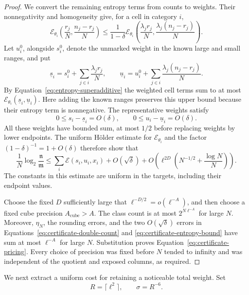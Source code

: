 \begin{proof}
We convert the remaining entropy terms from counts to weights. Their
nonnegativity and homogeneity give, for a cell in category \(i\),
\[
 \mathcal E_{\theta_i}\!\left(\frac{r_j}{N},\frac{n_j-r_j}{N}\right)
 \le\frac1{1-\delta}
 \mathcal E_{\theta_i}\!\left(
       \frac{\lambda_jr_j}{N},\frac{\lambda_j(n_j-r_j)}{N}\right).
\]
Let \(u_i^0\), alongside \(s_i^0\), denote the unmarked weight in the
known large and small ranges, and put
\[
 \underline s_i=s_i^0+\sum_{j\in i}\frac{\lambda_jr_j}{N},
 \qquad
 \underline u_i=u_i^0+\sum_{j\in i}\frac{\lambda_j(n_j-r_j)}{N}.
\]
By Equation~\eqref{eq:entropy-superadditive} the weighted cell terms
sum to at most
\(\mathcal E_{\theta_i}(\underline s_i,\underline u_i)\).
Here adding the known ranges preserves this upper bound because their
entropy term is nonnegative. The representative weights satisfy
\[
 0\le s_i-\underline s_i=O(\delta),\qquad
 0\le u_i-\underline u_i=O(\delta).
\]
All these weights have bounded sum, at most \(1/2\) before replacing
weights by lower endpoints. The uniform H\"older estimate for
\(\mathcal E_{\theta_i}\) and the factor
\((1-\delta)^{-1}=1+O(\delta)\) therefore show that
\begin{equation}\label{eq:certificate-entropy-bound}
 \frac1N\log_2\frac{\mathfrak n}{\mathfrak m}
 \le \sum_i\mathcal E(s_i,u_i,x_i)+O(\sqrt\delta)
   +O\!\left(\ell^{2D}\left(N^{-1/2}+\frac{\log N}{N}\right)\right).
\end{equation}
The constants in this estimate are uniform in the targets, including
their endpoint values.

Choose the fixed \(D\) sufficiently large that
\(\ell^{-D/2}=o(\ell^{-A})\), and then choose a fixed cube precision
\(A_{\mathrm{cube}}>A\). The class count is at most \(2^{N\ell^{-A}}\) for large
\(N\). Moreover, \(\eta_N\), the rounding errors, and the two
\(O(\sqrt\delta)\) errors in
Equations~\eqref{eq:certificate-double-count} and
\eqref{eq:certificate-entropy-bound} have sum at most \(\ell^{-A}\)
for large \(N\). Substitution proves
Equation~\eqref{eq:certificate-pricing}. Every choice of precision was
fixed before \(N\) tended to infinity and was independent of the
quotient and exposed columns, as required.
\end{proof}

We next extract a uniform cost for retaining a noticeable total weight.
Set
\begin{equation}\label{eq:retention-scales}
 R=\lceil\ell^2\rceil,\qquad \sigma=R^{-6}.
\end{equation}

